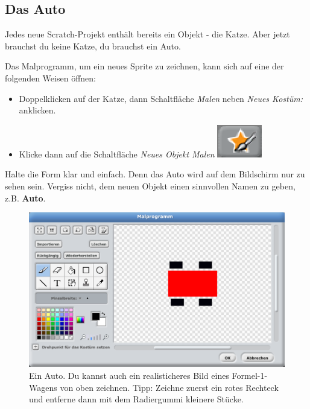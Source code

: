 \documentclass[12pt,a4paper,titlepage]{article}
\begin{document}
\subsection{Das Auto}
\label{sub:auto}

Jedes neue Scratch-Projekt enthält bereits ein Objekt - die Katze. Aber jetzt brauchst du keine Katze, du brauchst ein Auto.

Das Malprogramm, um ein neues Sprite zu zeichnen, kann sich auf eine der folgenden Weisen öffnen:

\begin{itemize}
\item Doppelklicken auf der Katze, dann Schaltfläche \textit{Malen} neben \textit{Neues Kostüm:} anklicken.
\item Klicke dann auf die Schaltfläche \textit{Neues Objekt Malen} \includegraphics[height=\ht\strutbox]{neues_objekt.png}
\end{itemize}

Halte die Form klar und einfach. Denn das Auto wird auf dem Bildschirm nur zu sehen sein. Vergiss nicht, dem neuen Objekt einen sinnvollen Namen zu geben, z.B. \textbf{Auto}.

\begin{figure}[H]
\centering
\includegraphics[scale=.3]{auto.png}
\caption{Ein Auto. Du kannst auch ein realisticheres Bild eines Formel-1-Wagens von oben zeichnen. Tipp: Zeichne zuerst ein rotes Rechteck und entferne dann mit dem Radiergummi kleinere Stücke.}
\label{fig:auto}
\end{figure}
\end{document}
